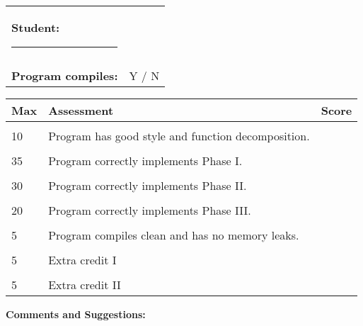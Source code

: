 \documentclass [12pt, letterpaper] {article}
\begin{document}
\thispagestyle{empty}	%

\begin{tabular}{ll}
\textbf{Student:} \rule{3in}{0.5pt} & \\
\\
\textbf{Program compiles:} & Y / N\\
\end{tabular}

\bigskip
\bigskip
\begin{tabular}{llr}
\textbf{Max} & \textbf{Assessment} & \textbf{Score}\\
\hline
\\
10 & Program has good style and function decomposition. & \hrulefill\\
\\
35 & Program correctly implements Phase I. & \hrulefill\\
\\
30 & Program correctly implements Phase II. & \hrulefill\\
\\
20 & Program correctly implements Phase III. & \hrulefill\\
\\
5 & Program compiles clean and has no memory leaks. & \hrulefill\\
\\
5 & Extra credit I & \hrulefill\\
\\
5 & Extra credit II & \hrulefill\\
\end{tabular}

\bigskip
\bigskip
\textbf{Comments and Suggestions:}
\end{document}
